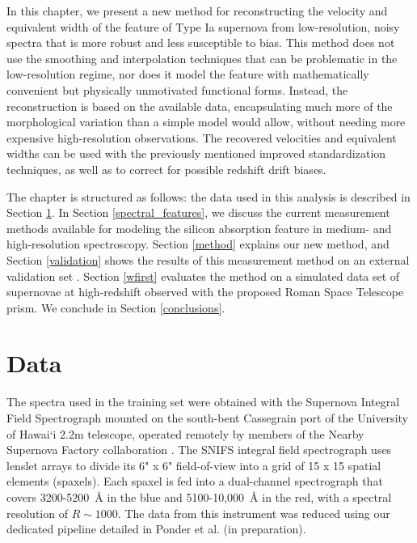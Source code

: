 In this chapter, we present a new method for reconstructing the velocity and equivalent width of the \siliconii{} feature of Type Ia supernova from low-resolution, noisy spectra that is more robust and less susceptible to bias. This method does not use the smoothing and interpolation techniques that can be problematic in the low-resolution regime, nor does it model the feature with mathematically convenient but physically unmotivated functional forms. Instead, the reconstruction is based on the available data, encapsulating much more of the morphological variation than a simple model would allow, without needing more expensive high-resolution observations. The recovered velocities and equivalent widths can be used with the previously mentioned improved standardization techniques, as well as to correct for possible redshift drift biases.

The chapter is structured as follows: the data used in this analysis is described in Section \ref{data}. In Section \ref{spectral_features}, we discuss the current measurement methods available for modeling the silicon absorption feature in medium- and high-resolution spectroscopy. Section \ref{method} explains our new method, and Section \ref{validation} shows the results of this measurement method on an external validation set \citep[BSNIP,][]{silverman_berkeley_2012}. Section \ref{wfirst} evaluates the method on a simulated data set of supernovae at high-redshift observed with the proposed Roman Space Telescope prism. We conclude in Section \ref{conclusions}.

\section{Data}
\label{data}
The spectra used in the training set were obtained with the Supernova Integral Field Spectrograph \citep[SNIFS,][]{lantz_snifs_2004} mounted on  the south-bent Cassegrain port of the University of Hawai`i 2.2m telescope, operated remotely by members of the Nearby Supernova Factory collaboration \citep[SNfactory,][]{aldering_overview_2002}. The SNIFS integral field spectrograph uses lenslet arrays to divide its 6" x 6" field-of-view into a grid of 15 x 15 spatial elements (spaxels). Each spaxel is fed into a dual-channel spectrograph that covers 3200-5200~\AA{} in the blue and 5100-10,000~\AA{} in the red, with a spectral resolution of $R \sim 1000$. The data from this instrument was reduced using our dedicated pipeline detailed in Ponder et al. (in preparation).

